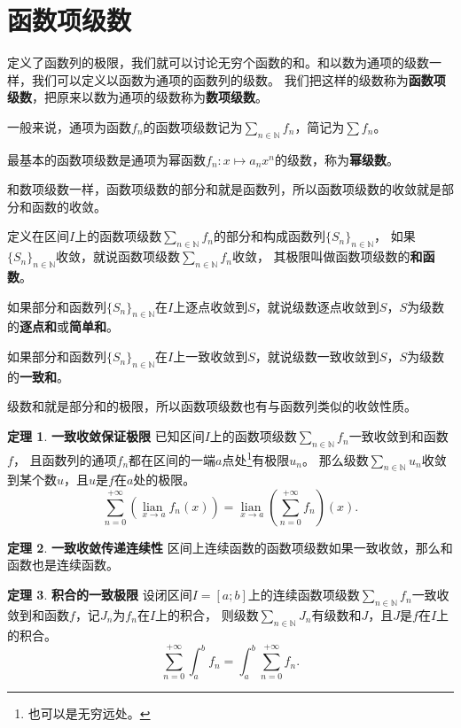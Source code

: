 \documentclass[12pt,UTF8]{ctexbook}
\newcommand{\lian}[1]{
    \underset{#1}{\operatorname{lian}\,}
}
\theoremstyle{definition}
\newtheorem{tm}{定理}[section]
\theoremstyle{plain}
\begin{document}
\section{函数项级数}

定义了函数列的极限，我们就可以讨论无穷个函数的和。和以数为通项的级数一样，我们可以定义以函数为通项的函数列的级数。
我们把这样的级数称为\textbf{函数项级数}，把原来以数为通项的级数称为\textbf{数项级数}。

一般来说，通项为函数$f_n$的函数项级数记为$\sum_{n\in\mathbb{N}} f_n$，简记为$\sum f_n$。

最基本的函数项级数是通项为幂函数$f_n: x\mapsto a_n x^n$的级数，称为\textbf{幂级数}。

和数项级数一样，函数项级数的部分和就是函数列，所以函数项级数的收敛就是部分和函数的收敛。

定义在区间$I$上的函数项级数$\sum_{n\in\mathbb{N}} f_n$的部分和构成函数列$\{S_n\}_{n\in\mathbb{N}}$，
如果$\{S_n\}_{n\in\mathbb{N}}$收敛，就说函数项级数$\sum_{n\in\mathbb{N}} f_n$收敛，
其极限叫做函数项级数的\textbf{和函数}。

如果部分和函数列$\{S_n\}_{n\in\mathbb{N}}$在$I$上逐点收敛到$S$，就说级数逐点收敛到$S$，$S$为级数的\textbf{逐点和}或\textbf{简单和}。

如果部分和函数列$\{S_n\}_{n\in\mathbb{N}}$在$I$上一致收敛到$S$，就说级数一致收敛到$S$，$S$为级数的\textbf{一致和}。

级数和就是部分和的极限，所以函数项级数也有与函数列类似的收敛性质。

\begin{tm}{\textbf{一致收敛保证极限}}
    已知区间$I$上的函数项级数$\sum_{n\in\mathbb{N}} f_n$一致收敛到和函数$f$，
    且函数列的通项$f_n$都在区间的一端$a$点处\footnote{也可以是无穷远处。}有极限$u_n$。
    那么级数$\sum_{n\in\mathbb{N}} u_n$收敛到某个数$u$，且$u$是$f$在$a$处的极限。
    $$ \sum_{n=0}^{+\infty} \left(\lian{x\to a} f_n(x) \right) = \lian{x\to a} \left(\sum_{n=0}^{+\infty} f_n\right)(x). $$
\end{tm}

\begin{tm}{\textbf{一致收敛传递连续性}}
    区间上连续函数的函数项级数如果一致收敛，那么和函数也是连续函数。
\end{tm}

\begin{tm}{\textbf{积合的一致极限}}
    设闭区间$I=[a;b]$上的连续函数项级数$\sum_{n\in\mathbb{N}} f_n$一致收敛到和函数$f$，记$J_n$为$f_n$在$I$上的积合，
    则级数$\sum_{n\in\mathbb{N}} J_n$有级数和$J$，且$J$是$f$在$I$上的积合。
    $$ \sum_{n=0}^{+\infty} \int_a^b f_n = \int_a^b \sum_{n=0}^{+\infty} f_n. $$
\end{tm}
\end{document}

